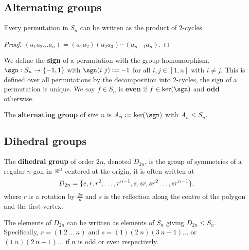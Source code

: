 \documentclass[../Year1/Year1.tex]{subfiles}
\begin{document}
\subsection{Alternating groups}

\begin{theorem}
    Every permutation in $S_n$ can be written as the product of $2$-cycles.
\end{theorem}

\begin{proof}
    $(a_1a_2\ldots a_n) = (a_1a_2)(a_2a_3)\cdots(a_{n-1}a_n)$.
\end{proof}

\begin{definition}
    We define the \textbf{sign} of a permutation with the group homomorphism, $\sgn:S_n\rightarrow\{-1,1\}$ with $\sgn(i \ j) := -1$ for all $i,j\in[1,n]$ with $i\neq j$. This is defined over all permutations by the decomposition into $2$-cycles, the sign of a permutation is unique. We say $f\in S_n$ is \textbf{even} if $f\in\ker(\sgn)$ and \textbf{odd} otherwise.
\end{definition}

\begin{definition}
    The \textbf{alternating group} of size $n$ is $A_n := \ker(\sgn)$ with $A_n\leq S_n$.
\end{definition}

\subsection{Dihedral groups}

\begin{definition}
    The \textbf{dihedral group} of order $2n$, denoted $D_{2n}$, is the group of symmetries of a regular $n$-gon in $\mathbb{R}^3$ centered at the origin, it is often written at \[
        D_{2n} = \{e,r,r^2,\ldots,r^{n-1},s,sr,sr^2\ldots,sr^{n-1}\}
    \textcolor{black}{,}
    \] where $r$ is a rotation by $\frac{2\pi}{n}$ and $s$ is the reflection along the centre of the polygon and the first vertex.
\end{definition}

\begin{theorem}
    The elements of $D_{2n}$ can be written as elements of $S_n$ giving $D_{2n}\leq S_n$. Specifically, $r = (1 \ 2 \ \ldots \ n)$ and $s = (1)(2 \ n)(3 \ n-1)\ldots$ or $(1 \ n)(2 \ n-1)\ldots$ if $n$ is odd or even respectively.
\end{theorem}
\end{document}

